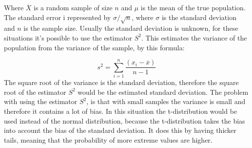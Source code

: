 Where $\overline{X}$ is a random sample of size $n$ and $\mu$ is the mean of the true population. The standard error i represented by $\sigma/\sqrt{n}$, where $\sigma$ is the standard deviation and $n$ is the sample size.
Usually the standard deviation is unknown, for these situations it's possible to use the estimator $S^2$. This estimates the variance of the population from the variance of the sample, by this formula:

\begin{equation}
s^2=\sum_{i=1}^{n}\frac{(x_{i}-\overline{x})}{n-1}
\end{equation}
The square root of the variance is the standard deviation, therefore the square root of the estimator $S^2$ would be the estimated standard deviation. The problem with using the estimator $S^2$, is that with small samples the variance is small and therefore it contains a lot of bias. In this situation the t-distribution would be used instead of the normal distribution, because the t-distribution takes the bias into account the bias of the standard deviation. It does this by having thicker tails, meaning that the probability of more extreme values are higher.

